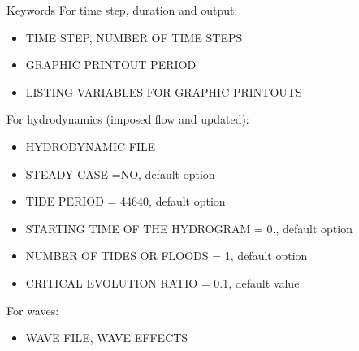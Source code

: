 \begin{itemize}
\medskip
\begin{bclogo}[couleur=blue!10,arrondi=0.1, logo=\bcinfo]{Keywords}
For time step, duration and output:
\begin{itemize}
\item {\ttfamily TIME STEP, NUMBER OF TIME STEPS}
\item {\ttfamily GRAPHIC PRINTOUT PERIOD} 
\item {\ttfamily LISTING VARIABLES FOR GRAPHIC PRINTOUTS}
\end{itemize}
For hydrodynamics (imposed flow and updated):
\begin{itemize}
\item {\ttfamily HYDRODYNAMIC FILE}
\item {\ttfamily STEADY CASE =NO}, default option
\item {\ttfamily TIDE PERIOD = 44640}, default option
\item {\ttfamily STARTING TIME OF THE HYDROGRAM = 0.}, default
option
\item {\ttfamily NUMBER OF TIDES OR FLOODS = 1}, default option
\item {\ttfamily CRITICAL EVOLUTION RATIO = 0.1}, default value
\end{itemize}
For waves: 
\begin{itemize}
\item {\ttfamily WAVE FILE, WAVE EFFECTS}
\end{itemize}
\end{bclogo}

\end{itemize}

